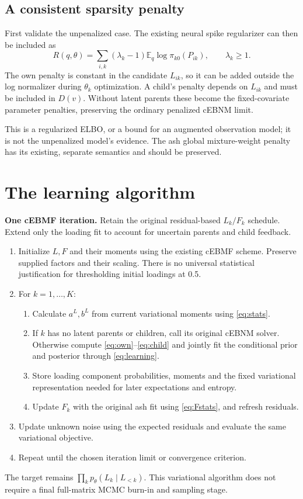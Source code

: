 \documentclass[11pt,a4paper]{article}
\newcommand{\E}{\mathbb E}
\newcommand{\note}[1]{\par\smallskip\noindent\colorbox{blue!5}{\parbox{\dimexpr\linewidth-2\fboxsep\relax}{#1}}\par\smallskip}
\begin{document}
\subsection{A consistent sparsity penalty}
First validate the unpenalized case. The existing neural spike regularizer
can then be included as
\begin{equation}
R(q,\theta)=\sum_{i,k}(\lambda_k-1)
\E_q\log\pi_{k0}(P_{ik}),\qquad \lambda_k\geq1.
\label{eq:penalty}
\end{equation}
The own penalty is constant in the candidate \(L_{ik}\), so it can be added outside
the log normalizer during \(\theta_k\) optimization. A child's penalty depends
on \(L_{ik}\) and must be included in \(D(v)\). Without latent parents these become
the fixed-covariate parameter penalties, preserving the ordinary penalized
cEBNM limit.

This is a regularized ELBO, or a bound for an augmented observation model;
it is not the unpenalized model's evidence. The ash global mixture-weight
penalty has its existing, separate semantics and should be preserved.

\clearpage
\section{The learning algorithm}
\note{\textbf{One cEBMF iteration.}
Retain the original residual-based \(L_k/F_k\) schedule. Extend only the loading
fit to account for uncertain parents and child feedback.}
\begin{enumerate}
\item Initialize \(L,F\) and their moments using the existing cEBMF scheme.
Preserve supplied factors and their scaling. There is no universal
statistical justification for thresholding initial loadings at 0.5.
\item For \(k=1,\ldots,K\):
  \begin{enumerate}[label=(\alph*)]
  \item Calculate \(a^L,b^L\) from current variational moments using
  \eqref{eq:stats}.
  \item If \(k\) has no latent parents or children, call its original cEBNM
  solver. Otherwise compute \eqref{eq:own}--\eqref{eq:child} and jointly
  fit the conditional prior and posterior through \eqref{eq:learning}.
  \item Store loading component probabilities, moments and the fixed
  variational representation needed for later expectations and entropy.
  \item Update \(F_k\) with the original ash fit using \eqref{eq:Fstats}, and
  refresh residuals.
  \end{enumerate}
\item Update unknown noise using the expected residuals and evaluate the
same variational objective.
\item Repeat until the chosen iteration limit or convergence criterion.
\end{enumerate}
The target remains \(\prod_kp_\theta(L_k\mid L_{<k})\). This variational
algorithm does not require a final full-matrix MCMC burn-in and sampling stage.
\end{document}
